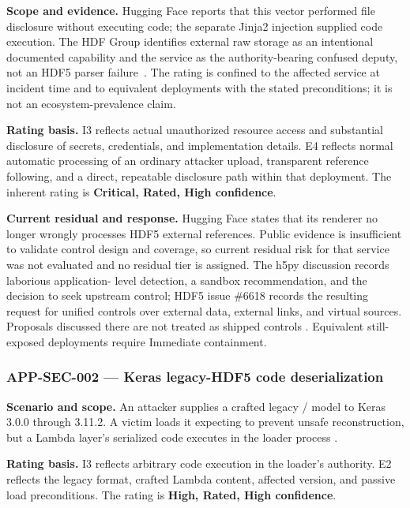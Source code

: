 \documentclass[../main.tex]{subfiles}
\begin{document}
\noindent\textbf{Scope and evidence.}
Hugging Face reports that this vector performed file disclosure without
executing code; the separate Jinja2 injection supplied code execution. The HDF
Group identifies external raw storage as an intentional documented capability
and the service as the authority-bearing confused deputy, not an HDF5 parser
failure~\cite{huggingface-agent-intrusion-2026,hdfgroup-mechanism-not-vulnerability-2026}.
The rating is confined to the affected service at incident time and to
equivalent deployments with the stated preconditions; it is not an
ecosystem-prevalence claim.

\noindent\textbf{Rating basis.}
I3 reflects actual unauthorized resource access and substantial disclosure of
secrets, credentials, and implementation details. E4 reflects normal automatic
processing of an ordinary attacker upload, transparent reference following,
and a direct, repeatable disclosure path within that deployment. The inherent
rating is \textbf{Critical, Rated, High confidence}.

\noindent\textbf{Current residual and response.}
Hugging Face states that its renderer no longer wrongly processes HDF5 external
references. Public evidence is insufficient to validate control design and
coverage, so current residual risk for that service was not evaluated and no
residual tier is assigned. The h5py discussion records laborious application-
level detection, a sandbox recommendation, and the decision to seek upstream
control; HDF5 issue \#6618 records the resulting request for unified controls
over external data, external links, and virtual sources. Proposals discussed
there are not treated as shipped controls
\cite{h5py-gh-issue-2891,hdf5-gh-issue-6618}. Equivalent still-exposed
deployments require Immediate containment.

\subsubsection*{APP-SEC-002 --- Keras legacy-HDF5 code deserialization}

\noindent\textbf{Scenario and scope.}
An attacker supplies a crafted legacy / model to Keras
3.0.0 through 3.11.2. A victim loads it expecting
 to prevent unsafe reconstruction, but a Lambda layer's
serialized code executes in the loader process
\cite{cve-2025-9905,keras-ghsa-36rr-ww3j-vrjv}.

\noindent\textbf{Rating basis.}
I3 reflects arbitrary code execution in the loader's authority. E2 reflects the
legacy format, crafted Lambda content, affected version, and passive load
preconditions. The rating is \textbf{High, Rated, High confidence}.
\end{document}
